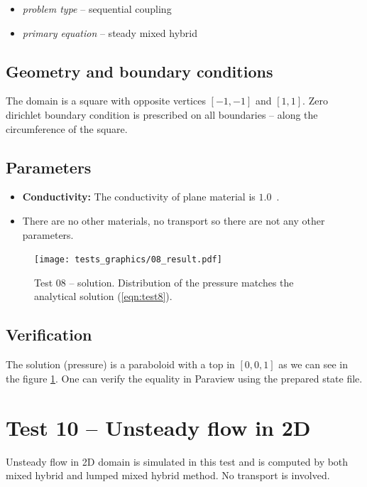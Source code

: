   \begin{itemize} 
    \item \emph{problem type} -- sequential coupling 
    \item \emph{primary equation} -- steady mixed hybrid
  \end{itemize}

\subsection*{Geometry and boundary conditions}
The domain is a square with opposite vertices $[-1,-1]$ and $[1,1]$. Zero dirichlet boundary condition is prescribed 
on all boundaries -- along the circumference of the square.
 
\subsection*{Parameters}
\begin{itemize}
  \item \textbf{Conductivity:} The conductivity of plane material is $1.0$~.
  \item There are no other materials, no transport so there are not any other parameters.
\end{itemize}
%
\begin{figure}[h!]
\centering
\texttt{[image: tests\_graphics/08\_result.pdf]}
\caption{Test 08 -- solution. Distribution of the pressure matches the analytical solution (\ref{eqn:test8}).}
\label{fig:test8_solution}
\end{figure}
%
\subsection*{Verification}
The solution (pressure) is a paraboloid with a top in $[0,0,1]$ as we can see in the figure \ref{fig:test8_solution}. 
One can verify the equality in Paraview using the prepared state file.



\section{Test 10 -- Unsteady flow in 2D}
\label{sec:test10}
Unsteady flow in 2D domain is simulated in this test and is computed by both mixed hybrid and 
lumped mixed hybrid method. No transport is involved. 

